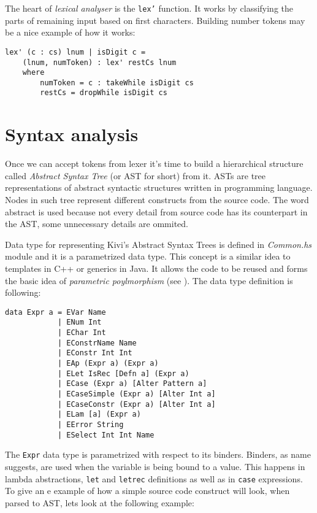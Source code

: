 \documentclass[12pt,a4paper]{report}
\begin{document}
The heart of \textit{lexical analyser} is the \texttt{lex'} function. It works
by classifying the parts of remaining input based on first characters.
Building number tokens may be a nice example of how it works:

\hspace*{-1.5in}
\begin{lstlisting}[label=lst:lex_comment,caption={Building tokens from numbers.}]
lex' (c : cs) lnum | isDigit c =
    (lnum, numToken) : lex' restCs lnum
    where
        numToken = c : takeWhile isDigit cs
        restCs = dropWhile isDigit cs
\end{lstlisting}


\section{Syntax analysis}
\label{sec:syntax_analysis}
Once we can accept tokens from lexer it's time to build a hierarchical
structure called \textit{Abstract Syntax Tree} (or AST for short) from it. ASTs
are tree representations of abstract syntactic structures written in
programming language. Nodes in such tree represent different constructs from
the source code. The word abstract is used because not every detail from source
code has its counterpart in the AST, some unnecessary details are ommited.

Data type for representing Kivi's Abstract Syntax Trees is defined in
\textit{Common.hs} module and it is a parametrized data type. This concept is
a similar idea to templates in C++ or generics in Java. It allows the code to
be reused and forms the basic idea of \textit{parametric poylmorphism}
(see \cite{website:parametric_polymorphism}). The data type definition is
following:

\hspace*{-1.5in}
\begin{lstlisting}
data Expr a = EVar Name
            | ENum Int
            | EChar Int
            | EConstrName Name
            | EConstr Int Int
            | EAp (Expr a) (Expr a)
            | ELet IsRec [Defn a] (Expr a)
            | ECase (Expr a) [Alter Pattern a]
            | ECaseSimple (Expr a) [Alter Int a]
            | ECaseConstr (Expr a) [Alter Int a]
            | ELam [a] (Expr a)
            | EError String
            | ESelect Int Int Name
\end{lstlisting}
The \texttt{Expr} data type is parametrized with respect to its binders.
Binders, as name suggests, are used when the variable is being bound to a
value. This happens in lambda abstractions, \texttt{let} and \texttt{letrec}
definitions as well as in \texttt{case} expressions. To give an e example of
how a simple source code construct will look, when parsed to AST,  lets look at
the following example:
\end{document}
